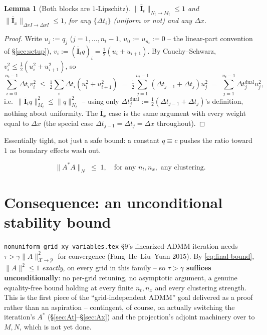 \documentclass[11pt]{article}
\newtheorem{lemma}{Lemma}
\newcommand{\dt}{\Delta t}
\newcommand{\dx}{\Delta x}
\newcommand{\code}[1]{\texttt{#1}}
\begin{document}
\begin{lemma}[Both blocks are $1$-Lipschitz]
\label{lem:1lip}
$\|\bar{\mathbf I}_t\|_{N_t\to M_t}\le1$ and $\|\bar{\mathbf I}_x\|_{\dx I\to\dx I}\le1$,
for \emph{any} $\{\dt_i\}$ (uniform or not) and any $\dx$.
\end{lemma}
\begin{proof}
Write $u_j:=q_j$ ($j=1,\ldots,n_t-1$, $u_0:=u_{n_t}:=0$ -- the linear-part convention of
\S\ref{sec:setup}), $v_i:=(\bar{\mathbf I}_tq)_i=\tfrac12(u_i+u_{i+1})$. By
Cauchy--Schwarz, $v_i^2\le\tfrac12(u_i^2+u_{i+1}^2)$, so
\[
  \sum_{i=0}^{n_t-1}\dt_iv_i^2 \;\le\; \tfrac12\sum_i\dt_i(u_i^2+u_{i+1}^2)
  \;=\; \tfrac12\sum_{j=1}^{n_t-1}(\dt_{j-1}+\dt_j)u_j^2
  \;=\; \sum_{j=1}^{n_t-1}\dt_j^{\mathrm{dual}}u_j^2,
\]
i.e.\ $\|\bar{\mathbf I}_tq\|_{M_t}^2\le\|q\|_{N_t}^2$ -- using only
$\dt_j^{\mathrm{dual}}:=\tfrac12(\dt_{j-1}+\dt_j)$'s definition, nothing about
uniformity. The $\bar{\mathbf I}_x$ case is the same argument with every weight equal to
$\dx$ (the special case $\dt_{j-1}=\dt_j=\dx$ throughout).
\end{proof}
Essentially tight, not just a safe bound: a constant $q\equiv c$ pushes the ratio toward
$1$ as boundary effects wash out.

\begin{equation}
  \label{eq:final-bound}
  \boxed{\;\|A^*A\|_N \;\le\; 1,\quad\text{for any }n_t,n_x,\text{ any clustering.}\;}
\end{equation}

\section{Consequence: an unconditional stability bound}
\label{sec:consequence}

\code{nonuniform\_grid\_xy\_variables.tex} \S9's linearized-ADMM iteration needs
$\tau>\gamma\|A\|_{\mathcal X\to\mathcal Y}^2$ for convergence (Fang--He--Liu--Yuan
2015). By \eqref{eq:final-bound}, $\|A\|^2\le1$ \emph{exactly}, on every grid in this
family -- so \textbf{$\tau>\gamma$ suffices unconditionally}: no per-grid retuning, no
asymptotic argument, a genuine equality-free bound holding at every finite $n_t,n_x$ and
every clustering strength. This is the first piece of the ``grid-independent ADMM''
goal delivered as a proof rather than an aspiration -- contingent, of course, on actually
switching the iteration's $A^*$ (\S\ref{sec:At}--\S\ref{sec:Ax}) and the projection's
adjoint machinery over to $M,N$, which is not yet done.
\end{document}
